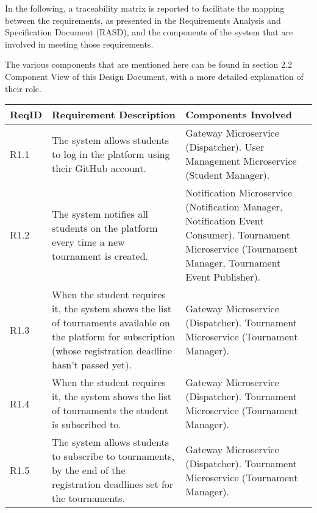 
In the following, a traceability matrix is reported to facilitate the mapping between the requirements, as presented in the Requirements Analysis and Specification Document (RASD), and the components of the \app system that are involved in meeting those requirements. 

The various components that are mentioned here can be found in section 2.2 Component View of this Design Document, with a more detailed explanation of their role.

\renewcommand{\arraystretch}{2.3}
\setlength{\tabcolsep}{0.6cm}

\begin{longtable}{p{1cm} p{5.5cm} p{6cm}}
	
	\textbf{ReqID} & \textbf{Requirement Description} & \textbf{Components Involved} \\ 
	\hline \endhead
	
	R1.1 & The system allows students to log in the platform using their GitHub account. & Gateway Microservice (Dispatcher). \newline User Management Microservice (Student Manager).\\
	
	R1.2 & The system notifies all students on the platform every time a new tournament is 
	created. & 
 	Notification Microservice (Notification Manager, Notification Event Consumer). \newline  Tournament Microservice (Tournament Manager, Tournament Event Publisher).\\
 	
 	R1.3 & When the student requires it, the system shows the list of tournaments available on the	platform for subscription (whose registration deadline hasn’t passed yet). & Gateway Microservice (Dispatcher). \newline Tournament Microservice (Tournament Manager).\\
 	
 	R1.4 & When the student requires it, the system shows the list of tournaments the student is subscribed to. & Gateway Microservice (Dispatcher). \newline Tournament Microservice (Tournament Manager).\\
 	
 	R1.5 & The system allows students to subscribe to tournaments, by the end of the registration
 	deadlines set for the tournaments. & Gateway Microservice (Dispatcher). \newline Tournament Microservice (Tournament Manager).\\
 	

\end{longtable}
